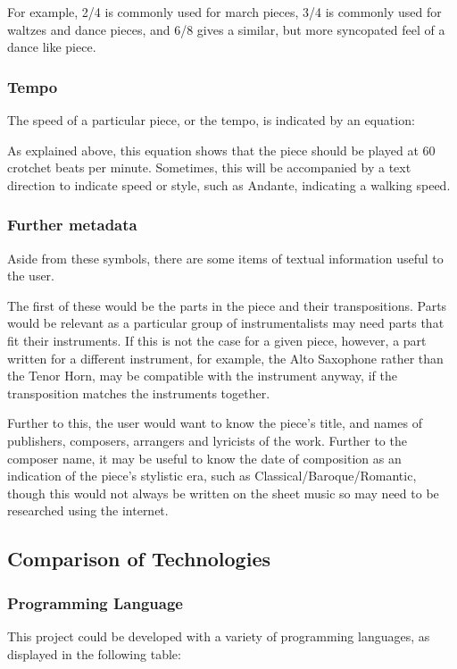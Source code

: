 For example, 2/4 is commonly used for march pieces, 3/4 is commonly used for waltzes and dance pieces, and 6/8 gives a similar, but more syncopated feel of a dance like piece.

\subsubsection{Tempo}
The speed of a particular piece, or the tempo, is indicated by an equation:

As explained above, this equation shows that the piece should be played at 60 crotchet beats per minute. Sometimes, this will be accompanied by a text direction to indicate speed or style, such as Andante, indicating a walking speed.

\subsubsection{Further metadata}
Aside from these symbols, there are some items of textual information useful to the user. 

The first of these would be the parts in the piece and their transpositions. Parts would be relevant as a particular group of instrumentalists may need parts that fit their instruments. If this is not the case for a given piece, however, a part written for a different instrument, for example, the Alto Saxophone rather than the Tenor Horn, may be compatible with the instrument anyway, if the transposition matches the instruments together.

Further to this, the user would want to know the piece's title, and names of publishers, composers, arrangers and lyricists of the work. Further to the composer name, it may be useful to know the date of composition as an indication of the piece's stylistic era, such as Classical/Baroque/Romantic, though this would not always be written on the sheet music so may need to be researched using the internet.


\subsection{Comparison of Technologies}
\subsubsection{Programming Language}
This project could be developed with a variety of programming languages, as displayed in the following table:

